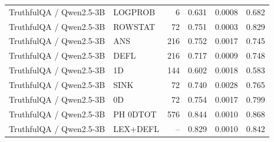 {\begin{tabular}{llrrrr}
TruthfulQA / Qwen2.5-3B & LOGPROB & 6 & 0.631 & 0.0008 & 0.682 \\
TruthfulQA / Qwen2.5-3B & ROWSTAT & 72 & 0.751 & 0.0003 & 0.829 \\
TruthfulQA / Qwen2.5-3B & ANS & 216 & 0.752 & 0.0017 & 0.745 \\
TruthfulQA / Qwen2.5-3B & DEFL & 216 & 0.717 & 0.0009 & 0.748 \\
TruthfulQA / Qwen2.5-3B & 1D & 144 & 0.602 & 0.0018 & 0.583 \\
TruthfulQA / Qwen2.5-3B & SINK & 72 & 0.740 & 0.0028 & 0.765 \\
TruthfulQA / Qwen2.5-3B & 0D & 72 & 0.754 & 0.0017 & 0.799 \\
TruthfulQA / Qwen2.5-3B & PH 0DTOT & 576 & 0.844 & 0.0010 & 0.868 \\
TruthfulQA / Qwen2.5-3B & LEX+DEFL & -- & 0.829 & 0.0010 & 0.842 \\
\bottomrule
\end{tabular}
}
